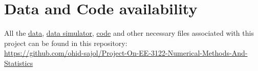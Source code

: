 \documentclass[a4paper,12pt,oneside]{book}
\begin{document}
\section*{Data and Code availability}
All the \href{https://github.com/ohid-sajol/Project-On-EE-3122-Numerical-Methods-And-Statistics/blob/main/simulated_voltage_unbalance_data.csv}{data}, \href{https://github.com/ohid-sajol/Project-On-EE-3122-Numerical-Methods-And-Statistics/blob/main/simulated_data_generator.ipynb}{data simulator}, \href{https://github.com/ohid-sajol/Project-On-EE-3122-Numerical-Methods-And-Statistics/blob/main/Linear_Regressor.ipynb}{code} and other necessary files associated with this project can be found in this repository:\\ \href{https://github.com/ohid-sajol/Project-On-EE-3122-Numerical-Methods-And-Statistics}{https://github.com/ohid-sajol/Project-On-EE-3122-Numerical-Methods-And-Statistics}
\end{document}
